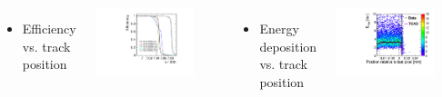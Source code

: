 \begin{frame}
\begin{columns}
  \end{columns}

  \begin{columns}[t]
    
    \begin{itemize}
    \item Efficiency vs. track position
    \end{itemize}
    \centering
    \includegraphics[width=0.8\textwidth, page=3]{../figures/TestBeam/edge_bcp.pdf}
    
    \begin{itemize}
    \item Energy deposition vs. track position
    \end{itemize}
    \centering
    \includegraphics[width=0.8\textwidth]{../figures/ActiveEdge/20_NGR_Edep_TCAD_data.pdf}

  \end{columns}

\end{frame}


\label{lastslide}
